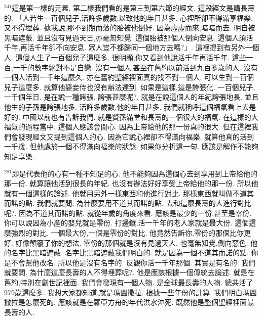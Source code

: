 \documentclass{book}
\begin{document}
$^{241}$這是第一樣的元素.
第二樣我們看的是第三到第六節的經文.
這段經文是講長壽的.
「人若生一百個兒子,活許多歲數,以致他的年日甚多.
心裡所卻不得滿享福樂,又不得埋葬.
據我說,那不到期而落的胎被他倒好.
因為虛虛而來,暗暗而去.
明自被黑暗遮蔽.
並且沒有見過天日,亦毫無知覺.
這個胎被那個人倒向安息.
這個人須活千年,再活千年卻不向安息.
眾人豈不都歸同一個地方去嗎?」.
這裡提到有另外一個人.
這個人生了一百個兒子這麼多.
很明顯,你又看到他說活千年再活千年.
這些一百,一千的數字絕對不是自戀.
沒有一個人,甚至在舊約以前活到九百多歲的人.
沒有一個人活到一千年這麼久.
亦在舊約聖經裡面真的找不到一個人.
可以生到一百個兒子這麼多.
就算他娶妾侍也沒有辦法達到.
如果是這樣,這是誇張化.
一百個兒子,一千個年日.
是在說一種誇張.
誇張甚麼呢?.
就是在說這個人的年紀誇張地長.
並且他生的子孫是誇張地多.
活許多歲數,他的年日甚多.
我們就稱呼這個福氣看上去是好的.
中國以前也有告訴我們.
就是賢孫滿堂和長壽的一個很大的福氣.
在這樣的大福氣的過程當中.
這個人應該會開心.
因為上帝給他的那一份真的很大.
但在這裡我們會發現經文又提到這個人的心.
因為它說心裡卻不得滿向福樂.
就算他真的活到一千歲.
但他處於一個不得滿向福樂的狀態.
如果你分析這一句.
應該是解作不能夠知足享樂.

$^{281}$即是代表他的心有一種不知足的心.
他不能夠因為這個心去到享用到上帝給他的那一份.
就算讓他活到很長的年紀.
也沒有辦法好好享受上帝給他的那一份.
所以他就有一個這樣的論述.
他就用另外一樣東西和他進行對比.
那樣東西就叫做不道其而諾的點.
我們就要問.
為什麼要用不道其而諾的點.
去和這麼長壽的人進行對比呢?.
因為不道其而諾的點.
就從年歲的角度來看.
應該是最少的一份,甚至是零份.
你可以說因為小產的嬰兒就是零份.
打邊鑲,活一千年的老人家就是最大份.
這個這麼強烈的對比.
一個最大份,一個是零份的對比.
他竟然告訴你,零份的那個比你更好.
好像顛覆了你的想法.
零份的那個就是沒有見過天人.
也毫無知覺,倒向惡色.
他的名字比黑暗遮蔽.
名字比黑暗遮蔽我們明白的.
就是因為一個不道其而諾的點.
你是不會幫他改名.
所以他是沒有名字的.
反觀你活一千年那個.
其實是有名的.
我們就要問.
為什麼這麼長壽的人不得埋葬呢?.
他是應該根據一個傳統去論述.
就是在舊約,特別在創世記裡面.
我們會發現有一個人物.
是全球最長壽的人物.
總共活了979歲這麼多.
我想大家都知道,就是瑪圖撒拉.
根據一些年份的計算.
我們明白瑪圖撒拉是怎麼死的.
應該就是在羅亞方舟的年代洪水沖死.
既然他是整個聖經裡面最長壽的人.
\end{document}
